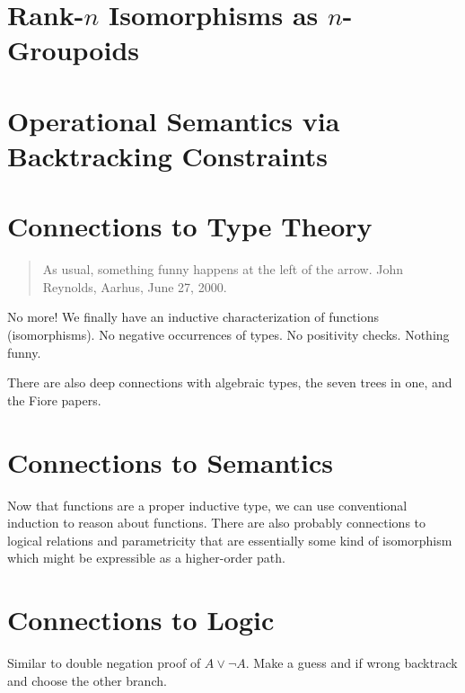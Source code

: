 \documentclass[11pt]{article}
\begin{document}
\section{Rank-$n$ Isomorphisms as $n$-Groupoids}

\section{Operational Semantics via Backtracking Constraints} 

\section{Connections to Type Theory} 

\begin{quote} 
As usual, something funny happens at the left of the arrow. John Reynolds,
Aarhus, June 27, 2000.~\cite{danvypage} 
\end{quote}

No more! We finally have an inductive characterization of functions
(isomorphisms). No negative occurrences of types. No positivity
checks. Nothing funny.

There are also deep connections with algebraic types, the seven trees in one,
and the Fiore papers.

\section{Connections to Semantics} 

Now that functions are a proper inductive type, we can use conventional
induction to reason about functions. There are also probably connections to
logical relations and parametricity that are essentially some kind of
isomorphism which might be expressible as a higher-order path.

\section{Connections to Logic} 

Similar to double negation proof of $A \vee \neg A$. Make a guess and if
wrong backtrack and choose the other branch.
\end{document}
